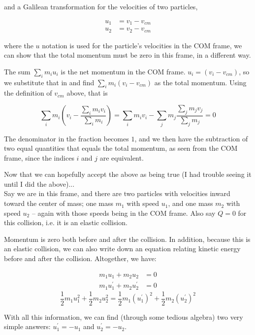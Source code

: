 and a Galilean transformation for the velocities of two particles,

\begin{align}
u_1 &= v_1 - v_{cm}\\
u_2 &= v_2 - v_{cm}
\end{align}

where the $u$ notation is used for the particle's velocities in the COM frame, we can show that the total momentum must be zero in this frame, in a different way.

The sum $\sum_i m_i u_i$ is the net momentum in the COM frame. $u_i = (v_i - v_{cm})$, so we substitute that in and find $\sum_i m_i (v_i - v_{cm})$ as the total momentum. Using the definition of $v_{cm}$ above, that is

\begin{equation}
\sum_i m_i \left(v_i - \frac{\sum_i m_i v_i}{\sum_i m_i}\right) = \sum_i m_i v_i - \sum_j m_j \frac{\sum_j m_j v_j}{\sum_j m_j} = 0
\end{equation}

The denominator in the fraction becomes $1$, and we then have the subtraction of two equal quantities that equals the total momentum, as seen from the COM frame, since the indices $i$ and $j$ are equivalent.

Now that we can hopefully accept the above as being true (I had trouble seeing it until I did the above)...\\
Say we are in this frame, and there are two particles with velocities inward toward the center of mass; one mass $m_1$ with speed $u_1$, and one mass $m_2$ with speed $u_2$ -- again with those speeds being in the COM frame. Also say $Q = 0$ for this collision, i.e. it is an elastic collision.

Momentum is zero both before and after the collision. In addition, because this is an elastic collision, we can also write down an equation relating kinetic energy before and after the collision. Altogether, we have:

\begin{align}
m_1 u_1 + m_2 u_2 &= 0\\
m_1 u_1^{'} + m_2 u_2^{'} &= 0
\end{align}
\begin{equation}
\frac{1}{2} m_1 u_1^2 + \frac{1}{2} m_2 u_2^2 = \frac{1}{2} m_1 (u_1^{'})^2 + \frac{1}{2} m_2 (u_2^{'})^2
\end{equation}

With all this information, we can find (through some tedious algebra) two very simple answers: $u_1^{'} = -u_1$ and $u_2^{'} = -u_2$.

